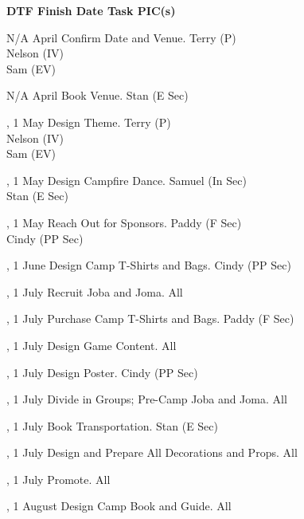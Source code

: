 \bTR\bTH    \bf{DTF}
\eTH\bTH    \bf{Finish Date}
\eTH\bTH    \bf{Task}
\eTH\bTH    \bf{PIC(s)}
\eTH\eTR

\eTABLEhead
\bTABLEbody

\bTR\bTD N/A
\eTD{} April
\eTD\bTD Confirm Date and Venue.
\eTD\bTD Terry (P) \\ Nelson (IV) \\ Sam (EV)
\eTD\eTR

\bTR\bTD N/A
\eTD{} April
\eTD\bTD Book Venue.
\eTD\bTD Stan (E Sec)
\eTD\eTR

\bTR{}, 1
\eTD{} May
\eTD\bTD Design Theme.
\eTD\bTD Terry (P) \\ Nelson (IV) \\ Sam (EV)
\eTD\eTR

\bTR{}, 1
\eTD{} May
\eTD\bTD Design Campfire Dance.
\eTD\bTD Samuel (In Sec) \\ Stan (E Sec)
\eTD\eTR

\bTR{}, 1
\eTD{} May
\eTD\bTD Reach Out for Sponsors.
\eTD\bTD Paddy (F Sec) \\ Cindy (PP Sec)
\eTD\eTR

\bTR{}, 1
\eTD{} June
\eTD\bTD Design Camp T-Shirts and Bags.
\eTD\bTD Cindy (PP Sec)
\eTD\eTR

\bTR{}, 1
\eTD{} July
\eTD\bTD Recruit Joba and Joma.
\eTD\bTD All
\eTD\eTR

\bTR{}, 1
\eTD{} July
\eTD\bTD Purchase Camp T-Shirts and Bags.
\eTD\bTD Paddy (F Sec)
\eTD\eTR

\bTR{}, 1
\eTD{} July
\eTD\bTD Design Game Content.
\eTD\bTD All
\eTD\eTR

\bTR{}, 1
\eTD{} July
\eTD\bTD Design Poster.
\eTD\bTD Cindy (PP Sec)
\eTD\eTR

\bTR{}, 1
\eTD{} July
\eTD\bTD Divide in Groups; Pre-Camp Joba and Joma.
\eTD\bTD All
\eTD\eTR

\bTR{}, 1
\eTD{} July
\eTD\bTD Book Transportation.
\eTD\bTD Stan (E Sec)
\eTD\eTR

\bTR{}, 1
\eTD{} July
\eTD\bTD Design and Prepare All Decorations and Props.
\eTD\bTD All
\eTD\eTR

\bTR{}, 1
\eTD{} July
\eTD\bTD Promote.
\eTD\bTD All
\eTD\eTR

\bTR{}, 1
\eTD{} August
\eTD\bTD Design Camp Book and Guide.
\eTD\bTD All
\eTD\eTR

